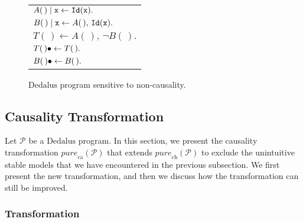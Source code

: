 \documentclass{tlp}
\newenvironment{cenchop}{\renewcommand{\arraystretch}{1.3}\begin{center}\begin{tabular}{l}}{\end{tabular}\end{center}\renewcommand{\arraystretch}{1}}
\newcommand{\qsp}{\\[1.2ex]}
\newcommand{\langname}[1]{\text{#1}}  \newcommand{\pred}[1]{\mathtt{#1}}  \newcommand{\fname}[1]{\mathit{#1}}  \newcommand{\sq}[1]{`{#1}'}
\newcommand{\dedalus}{\langname{Dedalus}}
\newcommand{\ded}{\mathcal{P}}
\newcommand{\ntup}{(\,)}
\newcommand{\var}[1]{\mathtt{#1}}
\newcommand{\tvar}[1]{\mathtt{\bar{#1}}}
\newcommand{\addlt}[3]{#1^{\Uparrow#2,#3}}
\newcommand{\reltime}{\pred{time}}
\newcommand{\timesucc}{\pred{tsucc}}
\newcommand{\relall}{\pred{all}}
\newcommand{\before}{\pred{before}}
\newcommand{\cand}{\pred{cand}}
\newcommand{\purech}[1]{\fname{pure}_{\mathrm{ch}}(#1)}
\newcommand{\purecaus}[1]{\fname{pure}_{\mathrm{ca}}(#1)}
\begin{document}
\begin{figure}
\begin{framed}
\begin{cenchop}

$A\ntup\sugas{\var x}\gets\relid(\var x).$\\

$B\ntup\sugas{\var x}\gets A\ntup,\,\relid(\var x).$\qsp

$T\ntup\gets A\ntup,\,\neg B\ntup.$\\

$T\ntup\sugind\gets T\ntup.$\\

$B\ntup\sugind\gets B\ntup.$

\end{cenchop}
\end{framed}
\caption{$\dedalus$ program sensitive to non-causality.}

\label{fig:non-causality}

\end{figure}




\subsection{Causality Transformation}

\label{sub:causal-transformation}

Let $\ded$ be a $\dedalus$ program. In this section, we present
the causality transformation $\purecaus{\ded}$ that extends $\purech{\ded}$
to exclude the unintuitive stable models that we have encountered in the
previous subsection. We first present the new transformation, and
then we discuss how the transformation can still be improved.


\subsubsection{Transformation}

\newcommand{\rulebeforestep}[1]{\before(\var x,\var s,\var x,\var t)\gets\relall(\var x),\,\timesucc(\var s,\var t)#1}


\newcommand{\rulebeforetr}[1]{\before(\var x,\var s,\var y,\var t)\gets\before(\var x,\var s,\var z,\var u),\,\before(\var z,\var u,\var y,\var t)#1}


\newcommand{\rulecandidate}[1]{\begin{array}{ll}\cand_{R}(\var x,\var s,\var y,\var t,\tvar u)\gets &  \addlt{\simplebody{\tvar u,\tvar v,\var y}}{\var x}{\var s},\,\relall(\var y),\,\reltime(\var t),\\&  \neg\before(\var y,\var t,\var x,\var s)#1 \end{array}}
\end{document}
